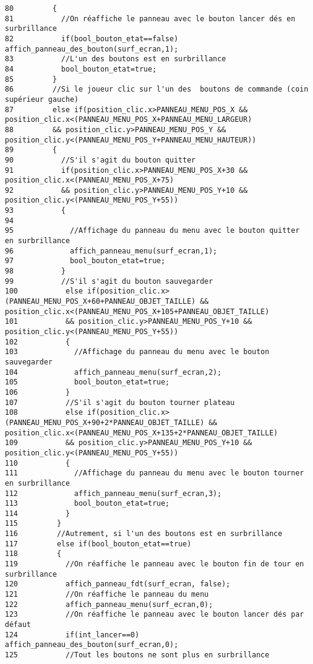 \begin{Code}
\begin{verbatim}
80         {
81           //On réaffiche le panneau avec le bouton lancer dés en surbrillance
82           if(bool_bouton_etat==false) affich_panneau_des_bouton(surf_ecran,1);
83           //L'un des boutons est en surbrillance
84           bool_bouton_etat=true;
85         }
86         //Si le joueur clic sur l'un des  boutons de commande (coin supérieur gauche)
87         else if(position_clic.x>PANNEAU_MENU_POS_X && position_clic.x<(PANNEAU_MENU_POS_X+PANNEAU_MENU_LARGEUR)
88         && position_clic.y>PANNEAU_MENU_POS_Y && position_clic.y<(PANNEAU_MENU_POS_Y+PANNEAU_MENU_HAUTEUR))
89         {
90           //S'il s'agit du bouton quitter
91           if(position_clic.x>PANNEAU_MENU_POS_X+30 && position_clic.x<(PANNEAU_MENU_POS_X+75)
92           && position_clic.y>PANNEAU_MENU_POS_Y+10 && position_clic.y<(PANNEAU_MENU_POS_Y+55))
93           {
94             
95             //Affichage du panneau du menu avec le bouton quitter en surbrillance
96             affich_panneau_menu(surf_ecran,1);
97             bool_bouton_etat=true;
98           }
99           //S'il s'agit du bouton sauvegarder
100           else if(position_clic.x>(PANNEAU_MENU_POS_X+60+PANNEAU_OBJET_TAILLE) && position_clic.x<(PANNEAU_MENU_POS_X+105+PANNEAU_OBJET_TAILLE)
101           && position_clic.y>PANNEAU_MENU_POS_Y+10 && position_clic.y<(PANNEAU_MENU_POS_Y+55))
102           {
103             //Affichage du panneau du menu avec le bouton sauvegarder
104             affich_panneau_menu(surf_ecran,2);
105             bool_bouton_etat=true;
106           }
107           //S'il s'agit du bouton tourner plateau
108           else if(position_clic.x>(PANNEAU_MENU_POS_X+90+2*PANNEAU_OBJET_TAILLE) && position_clic.x<(PANNEAU_MENU_POS_X+135+2*PANNEAU_OBJET_TAILLE)
109           && position_clic.y>PANNEAU_MENU_POS_Y+10 && position_clic.y<(PANNEAU_MENU_POS_Y+55))
110           {
111             //Affichage du panneau du menu avec le bouton tourner en surbrillance
112             affich_panneau_menu(surf_ecran,3);
113             bool_bouton_etat=true;
114           }
115         }
116         //Autrement, si l'un des boutons est en surbrillance
117         else if(bool_bouton_etat==true)
118         {
119           //On réaffiche le panneau avec le bouton fin de tour en surbrillance
120           affich_panneau_fdt(surf_ecran, false);
121           //On réaffiche le panneau du menu
122           affich_panneau_menu(surf_ecran,0);
123           //On réaffiche le panneau avec le bouton lancer dés par défaut
124           if(int_lancer==0) affich_panneau_des_bouton(surf_ecran,0);
125           //Tout les boutons ne sont plus en surbrillance

\end{verbatim}
\end{Code}
